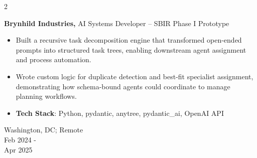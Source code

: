 \documentclass[10pt, letterpaper]{article}
\newenvironment{highlights}{
    \begin{itemize}[
        topsep=0.10 cm,
        parsep=0.10 cm,
        partopsep=0pt,
        itemsep=0pt,
        leftmargin=0.4 cm + 10pt
    ]
}{
    \end{itemize}
} %
\newenvironment{twocolentry}[2][]{
    \onecolentry
    \def\secondColumn{#2}
    \setcolumnwidth{\fill,4 cm}
    \begin{paracol}{2}
}{
    \switchcolumn \raggedleft \secondColumn
    \end{paracol}
    \endonecolentry
} %
\begin{document}
        
        \begin{twocolentry}{
            Washington, DC; Remote\\
            Feb 2024 - \\Apr 2025
        }
            \textbf{Brynhild Industries,}\; AI Systems Developer – SBIR Phase I Prototype
            \begin{highlights}
                \item Built a recursive task decomposition engine that transformed open-ended prompts into structured task trees, enabling downstream agent assignment and process automation.
                \item Wrote custom logic for duplicate detection and best-fit specialist assignment, demonstrating how schema-bound agents could coordinate to manage planning workflows.
                \item \textbf{Tech Stack}: Python, pydantic, anytree, pydantic\_ai, OpenAI API
            \end{highlights}
        \end{twocolentry}
\end{document}
